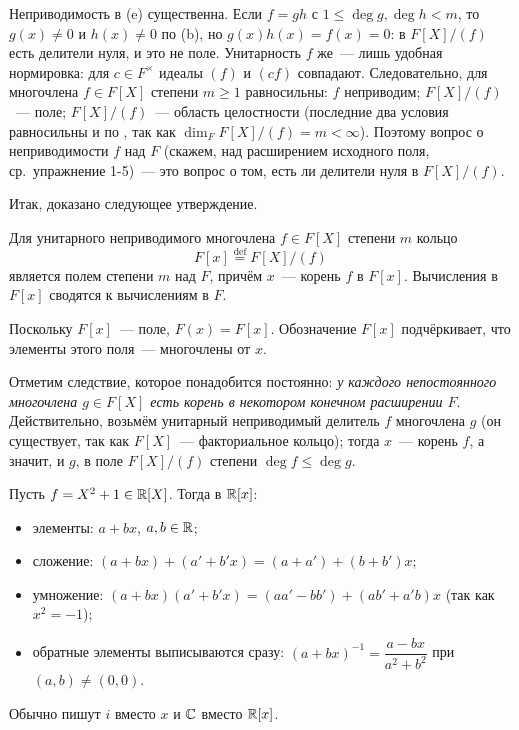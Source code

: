 Неприводимость в (e) существенна. Если $f=gh$ с $1\le\deg g,\deg h<m$, то $g(x)\ne0$ и $h(x)\ne0$ по (b), но
$g(x)h(x)=f(x)=0$: в $F[X]/(f)$ есть делители нуля, и это не поле. Унитарность $f$ же~--- лишь удобная нормировка: для
$c\in F^\times$ идеалы $(f)$ и $(cf)$ совпадают. Следовательно, для многочлена $f\in F[X]$ степени $m\ge1$ равносильны: $f$
неприводим; $F[X]/(f)$~--- поле; $F[X]/(f)$~--- область целостности (последние два условия равносильны и по ,
так как $\dim_FF[X]/(f)=m<\infty$). Поэтому вопрос о неприводимости $f$ над $F$ (скажем, над расширением исходного поля,
ср.\ упражнение 1-5)~--- это вопрос о том, есть ли делители нуля в $F[X]/(f)$.

Итак, доказано следующее утверждение.

\begin{proposition}[1.25]
Для унитарного неприводимого многочлена $f\in F[X]$ степени $m$ кольцо
\[
F[x]\overset{\mathrm{def}}{=}F[X]/(f)
\]
является полем степени $m$ над $F$, причём $x$~--- корень $f$ в $F[x]$. Вычисления в $F[x]$ сводятся к вычислениям в $F$.
\end{proposition}

Поскольку $F[x]$~--- поле, $F(x)=F[x]$. Обозначение $F[x]$ подчёркивает, что элементы этого поля~--- многочлены от $x$.

Отметим следствие, которое понадобится постоянно: \emph{у каждого непостоянного многочлена $g\in F[X]$ есть корень в
некотором конечном расширении $F$}. Действительно, возьмём унитарный неприводимый делитель $f$ многочлена $g$ (он
существует, так как $F[X]$~--- факториальное кольцо); тогда $x$~--- корень $f$, а значит, и $g$, в поле $F[X]/(f)$ степени
$\deg f\le\deg g$.

\begin{example}[1.26]
Пусть $f=X^2+1\in\mathbb R[X]$. Тогда в $\mathbb R[x]$:
\begin{itemize}[leftmargin=*]
\item элементы: $a+bx$, $a,b\in\mathbb R$;
\item сложение: $(a+bx)+(a'+b'x)=(a+a')+(b+b')x$;
\item умножение: $(a+bx)(a'+b'x)=(aa'-bb')+(ab'+a'b)x$ (так как $x^2=-1$);
\item обратные элементы выписываются сразу: $(a+bx)^{-1}=\dfrac{a-bx}{a^2+b^2}$ при $(a,b)\ne(0,0)$.
\end{itemize}
Обычно пишут $i$ вместо $x$ и $\mathbb C$ вместо $\mathbb R[x]$.
\end{example}

